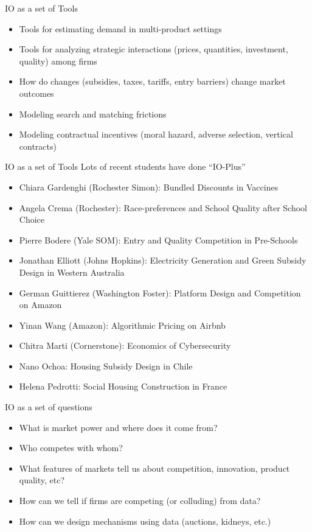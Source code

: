 \documentclass[aspectratio=169,11pt]{beamer}
\begin{document}
\begin{frame}{IO as a set of Tools}
\begin{itemize}
    \item Tools for estimating demand in multi-product settings
    \item Tools for analyzing strategic interactions (prices, quantities, investment, quality) among firms
    \item How do changes (subsidies, taxes, tariffs, entry barriers) change market outcomes
    \item Modeling search and matching frictions
    \item Modeling contractual incentives (moral hazard, adverse selection, vertical contracts)
\end{itemize}
\end{frame}



\begin{frame}{IO as a set of Tools}
Lots of recent students have done ``IO-Plus''
\begin{itemize}
    \item Chiara Gardenghi (Rochester Simon): Bundled Discounts in Vaccines
    \item Angela Crema (Rochester): Race-preferences and School Quality after School Choice
    \item Pierre Bodere (Yale SOM): Entry and Quality Competition in Pre-Schools
    \item Jonathan Elliott (Johns Hopkins): Electricity Generation and Green Subsidy Design in Western Australia
    \item German Guittierez (Washington Foster): Platform Design and Competition on Amazon
    \item Yinan Wang (Amazon): Algorithmic Pricing on Airbnb
    \item Chitra Marti (Cornerstone): Economics of Cybersecurity
    \item Nano Ochoa: Housing Subsidy Design in Chile
    \item Helena Pedrotti: Social Housing Construction in France
\end{itemize}
\end{frame}



\begin{frame}{IO as a set of questions}
\begin{itemize}
    \item What is market power and where does it come from?
    \item Who competes with whom?
    \item What features of markets tell us about competition, innovation, product quality, etc?
    \item How can we tell if firms are competing (or colluding) from data?
    \item How can we design mechanisms using data (auctions, kidneys, etc.)
\end{itemize}
\end{frame}
\end{document}
